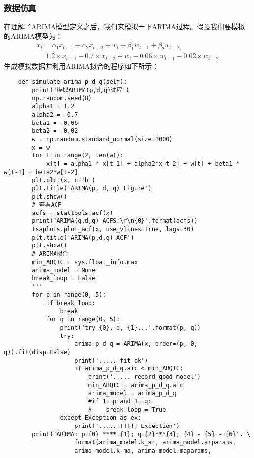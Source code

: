 \subsubsection{数据仿真}
在理解了ARIMA模型定义之后，我们来模拟一下ARIMA过程。假设我们要模拟的ARIMA模型为：
\begin{equation}
\begin{aligned}
x_{t}=\alpha _{1}x_{t-1} + \alpha _{2}x_{t-2} + w_{t} + \beta _1w_{t-1} + \beta _2w_{t-2} \\
=1.2 \times x_{t-1} - 0.7 \times x_{t-2} + w_{t} - 0.06 \times w_{t-1} - 0.02 \times w_{t-2}
\end{aligned}
\label{e000035}
\end{equation}
生成模拟数据并利用ARIMA拟合的程序如下所示：
\begin{lstlisting}
    def simulate_arima_p_d_q(self):
        print('模拟ARIMA(p,d,q)过程')
        np.random.seed(8)
        alpha1 = 1.2
        alpha2 = -0.7
        beta1 = -0.06
        beta2 = -0.02
        w = np.random.standard_normal(size=1000)
        x = w
        for t in range(2, len(w)):
            x[t] = alpha1 * x[t-1] + alpha2*x[t-2] + w[t] + beta1 * w[t-1] + beta2*w[t-2]
        plt.plot(x, c='b')
        plt.title('ARIMA(p, d, q) Figure')
        plt.show()
        # 查看ACF
        acfs = stattools.acf(x)
        print('ARIMA(q,d,q) ACFS:\r\n{0}'.format(acfs))
        tsaplots.plot_acf(x, use_vlines=True, lags=30)
        plt.title('ARIMA(p,d,q) ACF')
        plt.show()
        # ARIMA拟合
        min_ABQIC = sys.float_info.max
        arima_model = None
        break_loop = False
        '''
        for p in range(0, 5):
            if break_loop:
                break
            for q in range(0, 5):
                print('try {0}, d, {1}...'.format(p, q))
                try:
                    arima_p_d_q = ARIMA(x, order=(p, 0, q)).fit(disp=False)
                    print('..... fit ok')
                    if arima_p_d_q.aic < min_ABQIC:
                        print('..... record good model')
                        min_ABQIC = arima_p_d_q.aic
                        arima_model = arima_p_d_q
                        #if 1==p and 1==q:
                        #    break_loop = True
                except Exception as ex:
                    print('.....!!!!!! Exception')
        print('ARIMA: p={0} **** {1}; q={2}***{3}; {4} - {5} - {6}'. \
                    format(arima_model.k_ar, arima_model.arparams, 
                    arima_model.k_ma, arima_model.maparams, 

\end{lstlisting}
